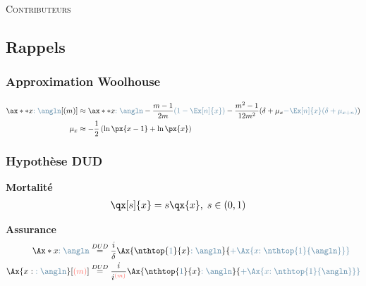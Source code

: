 \documentclass[10pt, french]{article}
\begin{document}
\begin{center}
	\textsc{\Large Contributeurs}\\[0.5cm] 
\end{center}


\newpage

\raggedcolumns
\begin{multicols*}{2} 

\subsection{Rappels}

\subsubsection*{Approximation Woolhouse}
\begin{align*}
	\ax**{x\color{airforceblue}{:\angln}}[(m)]	
	&\approx	\ax**{x\textcolor{airforceblue}{:\angln}}	-	
		\frac{m - 1}{2m} \textcolor{airforceblue}{\left( 1 - \Ex[n]{x} \right)}	-	
		\frac{m^{2} - 1}{12m^{2}}(\delta + \mu_{x} \textcolor{airforceblue}{- \Ex[n]{x} (\delta + \mu_{x + n})})		\\
	\mu_{x}
	&\approx		-	\frac{1}{2} \left( \ln \px{x - 1} + \ln \px{x} \right)
\end{align*}	

\subsubsection*{Hypothèse DUD}
\textbf{Mortalité}
\begin{align*}
	\qx[s]{x}
	&=	s \qx{x}, \;	s\in (0, 1)
\end{align*}

\textbf{Assurance}
\begin{align*}
	\Ax*{x\textcolor{airforceblue}{:\angln}}
	&\overset{DUD}{=}	\frac{i}{\delta}\Ax{\nthtop{\textcolor{airforceblue}{1}}{x}\textcolor{airforceblue}{:\angln}}		{\color{airforceblue} + \Ax{x\textcolor{airforceblue}{:\nthtop{1}{\angln}}}}	\\
	\Ax{x:\textcolor{airforceblue}{:\angln}}[\textcolor{pastelred}{(m)}]
	&\overset{DUD}{=}	\frac{i}{i^{\textcolor{pastelred}{(m)}}}\Ax{\nthtop{\textcolor{airforceblue}{1}}{x}\textcolor{airforceblue}{:\angln}}		{\color{airforceblue} + \Ax{x\textcolor{airforceblue}{:\nthtop{1}{\angln}}}}	\\
\end{align*}


\end{multicols*}
\end{document}
